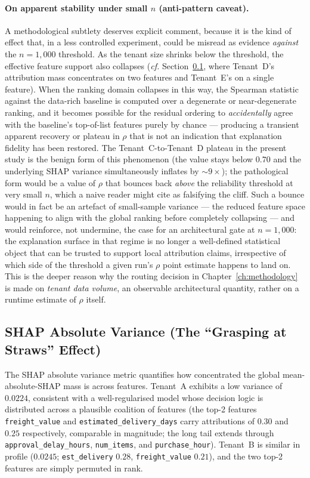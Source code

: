 \paragraph{On apparent stability under small $n$ (anti-pattern caveat).}
A methodological subtlety deserves explicit comment, because it is the
kind of effect that, in a less controlled experiment, could be misread as
evidence \emph{against} the $n = 1{,}000$ threshold. As the tenant size
shrinks below the threshold, the effective feature support also collapses
(\emph{cf.} Section~\ref{subsec:shap-variance}, where Tenant~D's
attribution mass concentrates on two features and Tenant~E's on a single
feature). When the ranking domain collapses in this way, the Spearman
statistic against the data-rich baseline is computed over a degenerate or
near-degenerate ranking, and it becomes possible for the residual ordering
to \emph{accidentally} agree with the baseline's top-of-list features
purely by chance --- producing a transient apparent recovery or plateau in
$\rho$ that is not an indication that explanation fidelity has been
restored. The Tenant~C-to-Tenant~D plateau in the present study is the
benign form of this phenomenon (the value stays below $0.70$ and the
underlying SHAP variance simultaneously inflates by $\sim\!9\times$);
the pathological form would be a value of $\rho$ that bounces back
\emph{above} the reliability threshold at very small $n$, which a naive
reader might cite as falsifying the cliff. Such a bounce would in fact be
an artefact of small-sample variance --- the reduced feature space
happening to align with the global ranking before completely collapsing
--- and would reinforce, not undermine, the case for an architectural
gate at $n = 1{,}000$: the explanation surface in that regime is no longer
a well-defined statistical object that can be trusted to support local
attribution claims, irrespective of which side of the threshold a given
run's $\rho$ point estimate happens to land on. This is the deeper reason
why the routing decision in Chapter~\ref{ch:methodology} is made on
\emph{tenant data volume}, an observable architectural quantity, rather
on a runtime estimate of $\rho$ itself.

\subsection{SHAP Absolute Variance (The ``Grasping at Straws'' Effect)}
\label{subsec:shap-variance}

The SHAP absolute variance metric quantifies how concentrated the global
mean-absolute-SHAP mass is across features. Tenant~A exhibits a low
variance of $0.0224$, consistent with a well-regularised model whose
decision logic is distributed across a plausible coalition of features
(the top-2 features \texttt{freight\_value} and
\texttt{estimated\_delivery\_days} carry attributions of $0.30$ and
$0.25$ respectively, comparable in magnitude; the long tail extends through
\texttt{approval\_delay\_hours}, \texttt{num\_items}, and
\texttt{purchase\_hour}). Tenant~B is similar in profile ($0.0245$;
\texttt{est\_delivery} $0.28$, \texttt{freight\_value} $0.21$), and the
two top-2 features are simply permuted in rank.

